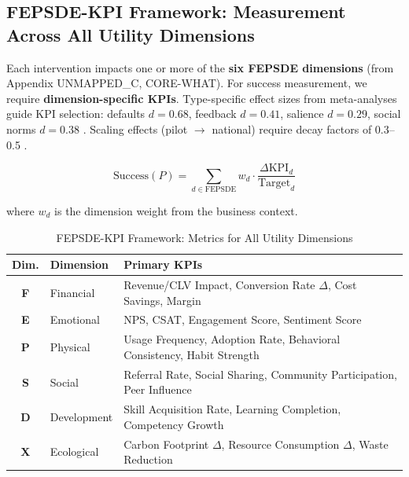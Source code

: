 \subsection{FEPSDE-KPI Framework: Measurement Across All Utility Dimensions}
\label{sec:hhh-fepsde-kpi}

\begin{tcolorbox}[colback=yellow!5!white, colframe=yellow!75!black,
    title=\textbf{Definition HHH-D7: FEPSDE-KPI Mapping}]

Each intervention impacts one or more of the \textbf{six FEPSDE dimensions} (from Appendix UNMAPPED_C, CORE-WHAT). For success measurement, we require \textbf{dimension-specific KPIs}. Type-specific effect sizes from meta-analyses guide KPI selection: defaults $d = 0.68$, feedback $d = 0.41$, salience $d = 0.29$, social norms $d = 0.38$ \citep{mertens2022choice}. Scaling effects (pilot $\to$ national) require decay factors of 0.3--0.5 \citep{soman2020successfully}.

\begin{equation}
\text{Success}(P) = \sum_{d \in \text{FEPSDE}} w_d \cdot \frac{\Delta \text{KPI}_d}{\text{Target}_d}
\end{equation}

where $w_d$ is the dimension weight from the business context.
\end{tcolorbox}

\begin{table}[htbp]
\centering
\caption{FEPSDE-KPI Framework: Metrics for All Utility Dimensions}
\label{tab:hhh-fepsde-kpi}
\renewcommand{\arraystretch}{1.3}
\footnotesize
\begin{tabular}{@{}clp{5cm}@{}}
\toprule
\textbf{Dim.} & \textbf{Dimension} & \textbf{Primary KPIs} \\
\midrule
\textbf{F} & Financial & Revenue/CLV Impact, Conversion Rate $\Delta$, Cost Savings, Margin \\
\textbf{E} & Emotional & NPS, CSAT, Engagement Score, Sentiment Score \\
\textbf{P} & Physical & Usage Frequency, Adoption Rate, Behavioral Consistency, Habit Strength \\
\textbf{S} & Social & Referral Rate, Social Sharing, Community Participation, Peer Influence \\
\textbf{D} & Development & Skill Acquisition Rate, Learning Completion, Competency Growth \\
\textbf{X} & Ecological & Carbon Footprint $\Delta$, Resource Consumption $\Delta$, Waste Reduction \\
\bottomrule
\end{tabular}
\end{table}

